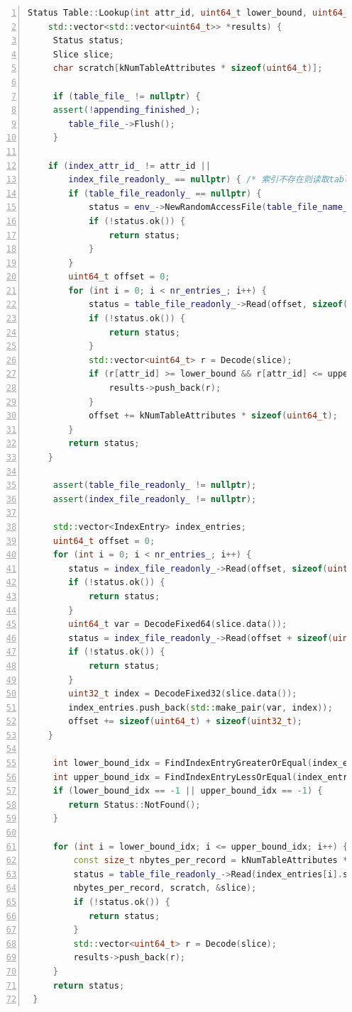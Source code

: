 \documentclass[bachelor]{thesis-uestc}
\begin{document}
 \begin{lstlisting}[language=C++, basicstyle=\ttfamily\tiny, numbers=left, numberstyle=\tiny, keywordstyle=\color{blue!70}, commentstyle=\color{red!50!green!50!blue!50}, frame=shadowbox, rulesepcolor=\color{red!20!green!20!blue!20}]
 Status Table::Lookup(int attr_id, uint64_t lower_bound, uint64_t upper_bound,
 	std::vector<std::vector<uint64_t>> *results) {
	 Status status;
	 Slice slice;
	 char scratch[kNumTableAttributes * sizeof(uint64_t)];
 
	 if (table_file_ != nullptr) {
	 assert(!appending_finished_);
	 	table_file_->Flush();
	 }
 
 	if (index_attr_id_ != attr_id ||
 		index_file_readonly_ == nullptr) { /* 索引不存在则读取table_file进行顺序查找 */
 		if (table_file_readonly_ == nullptr) {
 			status = env_->NewRandomAccessFile(table_file_name_, &table_file_readonly_);
 			if (!status.ok()) {
 				return status;
 			}
 		}
 		uint64_t offset = 0;
 		for (int i = 0; i < nr_entries_; i++) {
			status = table_file_readonly_->Read(offset, sizeof(scratch), scratch, &slice);
 			if (!status.ok()) {
 				return status;
 			}
 			std::vector<uint64_t> r = Decode(slice);
			if (r[attr_id] >= lower_bound && r[attr_id] <= upper_bound) {
			 	results->push_back(r);
			}
 			offset += kNumTableAttributes * sizeof(uint64_t);
 		}
 		return status;
 	}
 
	 assert(table_file_readonly_ != nullptr);
	 assert(index_file_readonly_ != nullptr);
	 
	 std::vector<IndexEntry> index_entries;
	 uint64_t offset = 0;
	 for (int i = 0; i < nr_entries_; i++) {
	 	status = index_file_readonly_->Read(offset, sizeof(uint64_t), scratch, &slice);
	 	if (!status.ok()) {
	 		return status;
		}
 		uint64_t var = DecodeFixed64(slice.data());
 		status = index_file_readonly_->Read(offset + sizeof(uint64_t), sizeof(uint32_t), scratch, &slice);
 		if (!status.ok()) {
 			return status;
 		}
 		uint32_t index = DecodeFixed32(slice.data());
 		index_entries.push_back(std::make_pair(var, index));
 		offset += sizeof(uint64_t) + sizeof(uint32_t);
 	}
 
	 int lower_bound_idx = FindIndexEntryGreaterOrEqual(index_entries, lower_bound);
	 int upper_bound_idx = FindIndexEntryLessOrEqual(index_entries, upper_bound);
	 if (lower_bound_idx == -1 || upper_bound_idx == -1) {
	 	return Status::NotFound();
	 }
 
	 for (int i = lower_bound_idx; i <= upper_bound_idx; i++) {
		 const size_t nbytes_per_record = kNumTableAttributes * sizeof(uint64_t);
		 status = table_file_readonly_->Read(index_entries[i].second * nbytes_per_record,
	 	 nbytes_per_record, scratch, &slice);
		 if (!status.ok()) {
		 	return status;
		 }
		 std::vector<uint64_t> r = Decode(slice);
		 results->push_back(r);
	 }
	 return status;
 }
 \end{lstlisting}
\end{document}
